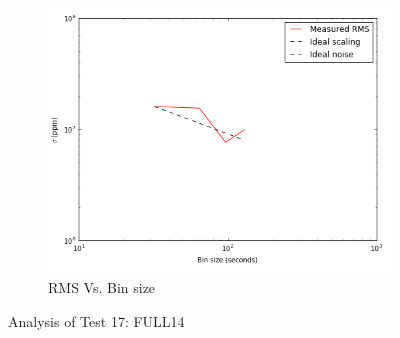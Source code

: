 \documentclass{aastex6}
\begin{document}
\begin{figure}[H]
    \begin{subfigure}{3}
        \includegraphics[scale=0.6]{rms_test17}
        \caption{RMS Vs. Bin size}
    \end{subfigure}
    \caption{Analysis of Test 17: FULL14}
\end{figure}
\end{document}
